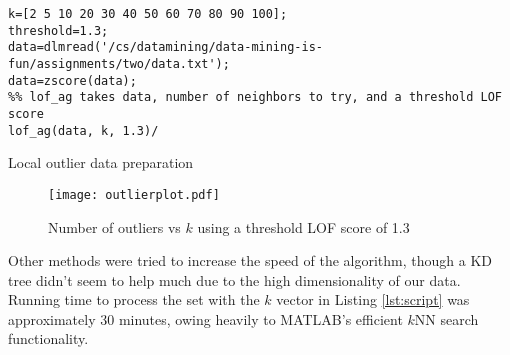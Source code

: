 \documentclass[titlepage]{article}\usepackage[]{graphicx}\usepackage[]{color}
\begin{document}
\begin{listing}[language=Matlab]
  \begin{verbatim}
k=[2 5 10 20 30 40 50 60 70 80 90 100];
threshold=1.3;
data=dlmread('/cs/datamining/data-mining-is-fun/assignments/two/data.txt');
data=zscore(data);
%% lof_ag takes data, number of neighbors to try, and a threshold LOF score 
lof_ag(data, k, 1.3)/
\end{verbatim}
\caption{Local outlier data preparation}
\label{lst:script}
\end{listing}

\begin{figure}
  \label{fig:outliers}
  \centering
  \texttt{[image: outlierplot.pdf]}
  \caption{Number of outliers vs $k$ using a threshold LOF score of 1.3}
\end{figure}

Other methods were tried to increase the speed of the algorithm, though a KD
tree didn't seem to help much due to the high dimensionality of our data.
Running time to process the set with the $k$ vector in Listing \ref{lst:script}
was approximately 30 minutes, owing heavily to MATLAB's efficient $k$NN search
functionality.
\end{document}
